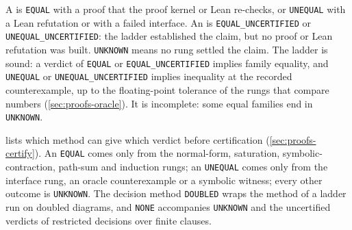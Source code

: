 \begin{definition}\label{def:proofs-verdicts}
A  is \texttt{EQUAL} with a proof that the proof kernel or Lean re-checks, or \texttt{UNEQUAL} with a Lean refutation or with a failed interface. An  is \texttt{EQUAL\_UNCERTIFIED} or \texttt{UNEQUAL\_UNCERTIFIED}: the ladder established the claim, but no proof or Lean refutation was built. \texttt{UNKNOWN} means no rung settled the claim. The ladder is sound: a verdict of \texttt{EQUAL} or \texttt{EQUAL\_UNCERTIFIED} implies family equality, and \texttt{UNEQUAL} or \texttt{UNEQUAL\_UNCERTIFIED} implies inequality at the recorded counterexample, up to the floating-point tolerance of the rungs that compare numbers (\cref{sec:proofs-oracle}). It is incomplete: some equal families end in \texttt{UNKNOWN}.
\end{definition}

 lists which method can give which verdict before certification (\cref{sec:proofs-certify}). An \texttt{EQUAL} comes only from the normal-form, saturation, symbolic-contraction, path-sum and induction rungs; an \texttt{UNEQUAL} comes only from the interface rung, an oracle counterexample or a symbolic witness; every other outcome is \texttt{UNKNOWN}. The decision method \texttt{DOUBLED} wraps the method of a ladder run on doubled diagrams, and \texttt{NONE} accompanies \texttt{UNKNOWN} and the uncertified verdicts of restricted decisions over finite clauses.

